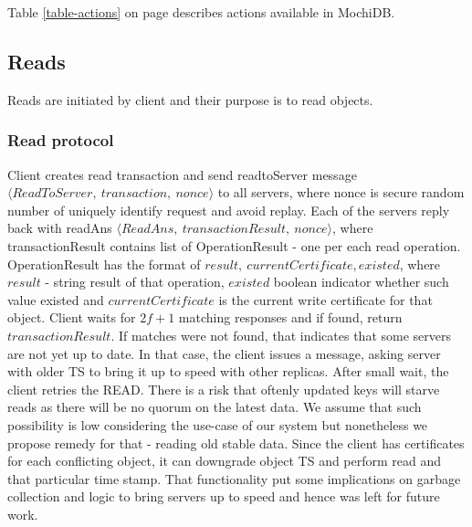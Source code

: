 \documentclass[letterpaper,twocolumn,10pt]{article}
\begin{document}
Table \ref{table-actions} on page \pageref{table-actions} describes actions available in MochiDB.

\begin{table}[]
\centering
\caption{MochiDB actions}
\label{table-actions}
\end{table}

\subsection{Reads}
Reads are initiated by client and their purpose is to read objects. 
\subsubsection{Read protocol}
Client creates read transaction and send readtoServer message $\langle ReadToServer,\ transaction,\ nonce \rangle$ to all servers, where nonce is secure random number of uniquely identify request and avoid replay. Each of the servers reply back with readAns $\langle ReadAns,\ transactionResult,\ nonce \rangle$, where transactionResult contains list of OperationResult - one per each read operation. OperationResult has the format of ${result,\ currentCertificate, existed}$, where $result$ - string result of that operation, $existed$ boolean indicator whether such value existed and $currentCertificate$ is the current write certificate for that object.
Client waits for $2f+1$ matching responses and if found, return $transactionResult$. If matches were not found, that indicates that some servers are not yet up to date. In that case, the client issues a message, asking server with older TS to bring it up to speed with other replicas. After small wait, the client retries the READ.
There is a risk that oftenly updated keys will starve reads as there will be no quorum on the latest data. We assume that such possibility is low considering the use-case of our system but nonetheless we propose remedy for that - reading old stable data. Since the client has certificates for each conflicting object, it can downgrade object TS and perform read and that particular time stamp. That functionality put some implications on garbage collection and logic to bring servers up to speed and hence was left for future work.
\end{document}
